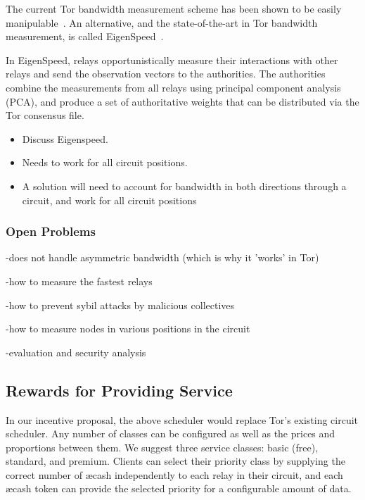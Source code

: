 The current Tor bandwidth measurement scheme has been shown to be easily
manipulable~\cite{biryukov2013trawling}. An alternative, and the
state-of-the-art in Tor bandwidth measurement, is called
EigenSpeed~\cite{snader2009eigenspeed, snader2011improving}.

In EigenSpeed, relays opportunistically measure their interactions with other
relays and send the observation vectors to the authorities. The authorities
combine the measurements from all relays using principal component analysis
(PCA), and produce a set of authoritative weights that can be distributed via
the Tor consensus file. \todo[in progress]

\begin{itemize}
\item Discuss Eigenspeed.
\item Needs to work for all circuit positions.
\item A solution will need to account for bandwidth in both directions through a circuit, and work for all circuit positions
\end{itemize}

\subsubsection{Open Problems}

-does not handle asymmetric bandwidth (which is why it 'works' in Tor)

-how to measure the fastest relays

-how to prevent sybil attacks by malicious collectives

-how to measure nodes in various positions in the circuit

-evaluation and security analysis

\subsection{Rewards for Providing Service}

In our incentive proposal, the above scheduler would replace Tor's existing
circuit scheduler. Any number of classes can be configured as well as the prices
and proportions between them. We suggest three service classes: basic (free),
standard, and premium. Clients can select their priority class by supplying the
correct number of \ae{cash} independently to each relay in their circuit, and
each \ae{cash} token can provide the selected priority for a configurable amount
of data.

